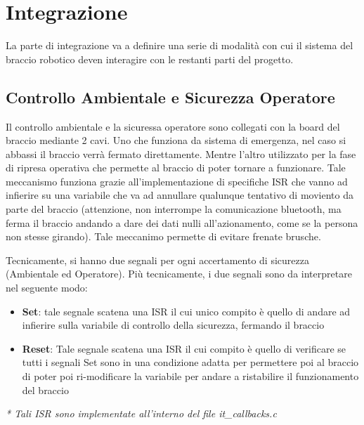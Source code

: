 \chapter{Integrazione}
La parte di integrazione va a definire una serie di modalità con cui il sistema del braccio robotico deven interagire con le restanti parti del progetto. 

\section{Controllo Ambientale e Sicurezza Operatore}
Il controllo ambientale e la sicuressa operatore sono collegati con la board del braccio mediante 2 cavi. Uno che funziona da sistema di emergenza, nel caso si abbassi il braccio verrà fermato direttamente. Mentre l'altro utilizzato per la fase di ripresa operativa che permette al braccio di poter tornare a funzionare.
Tale meccanismo funziona grazie all'implementazione di specifiche ISR che vanno ad infierire su una variabile che va ad annullare qualunque tentativo di moviento da parte del braccio (attenzione, non interrompe la comunicazione bluetooth, ma ferma il braccio andando a dare dei dati nulli all'azionamento, come se la persona non stesse girando). Tale meccanimo permette di evitare frenate brusche.

Tecnicamente, si hanno due segnali per ogni accertamento di sicurezza (Ambientale ed Operatore). Più tecnicamente, i due segnali sono da interpretare nel seguente modo:
\begin{itemize}
    \item \textbf{Set}: tale segnale scatena una ISR il cui unico compito è quello di andare ad infierire sulla variabile di controllo della sicurezza, fermando il braccio

    \item \textbf{Reset}: Tale segnale scatena una ISR il cui compito è quello di verificare se tutti i segnali Set sono in una condizione adatta per permettere poi al braccio di poter poi ri-modificare la variabile per andare a ristabilire il funzionamento del braccio

\end{itemize}

\textit{* Tali ISR sono implementate all'interno del file it\_callbacks.c}

